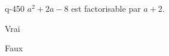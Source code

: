 \begin{truefalse}{q-450}
$a^2+2a-8$ est factorisable par $a+2$.
\item Vrai
\item* Faux
\end{truefalse}


